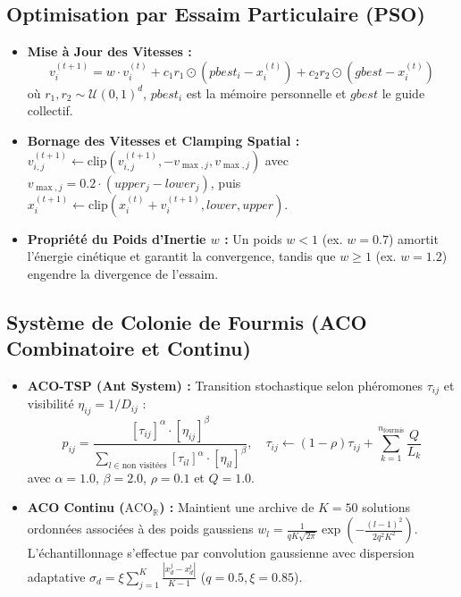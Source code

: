 \documentclass[11pt,a4paper]{article}
\begin{document}
\subsection{Optimisation par Essaim Particulaire (PSO)}
\begin{itemize}\setlength{\itemsep}{0.1em}
    \item \textbf{Mise à Jour des Vitesses :}
    \begin{equation}
        v_i^{(t+1)} = w \cdot v_i^{(t)} + c_1 r_1 \odot \left( pbest_i - x_i^{(t)} \right) + c_2 r_2 \odot \left( gbest - x_i^{(t)} \right)
    \end{equation}
    où $r_1, r_2 \sim \mathcal{U}(0, 1)^d$, $pbest_i$ est la mémoire personnelle et $gbest$ le guide collectif.
    \item \textbf{Bornage des Vitesses et Clamping Spatial :}
    $v_{i, j}^{(t+1)} \leftarrow \text{clip}(v_{i, j}^{(t+1)}, -v_{\max, j}, v_{\max, j})$ avec $v_{\max, j} = 0.2 \cdot (upper_j - lower_j)$, puis $x_i^{(t+1)} \leftarrow \text{clip}(x_i^{(t)} + v_i^{(t+1)}, lower, upper)$.
    \item \textbf{Propriété du Poids d'Inertie $w$ :} Un poids $w < 1$ (ex. $w=0.7$) amortit l'énergie cinétique et garantit la convergence, tandis que $w \ge 1$ (ex. $w=1.2$) engendre la divergence de l'essaim.
\end{itemize}

\subsection{Système de Colonie de Fourmis (ACO Combinatoire et Continu)}
\begin{itemize}\setlength{\itemsep}{0.1em}
    \item \textbf{ACO-TSP (Ant System) :} Transition stochastique selon phéromones $\tau_{ij}$ et visibilité $\eta_{ij} = 1/D_{ij}$ :
    \begin{equation}
        p_{ij} = \frac{[\tau_{ij}]^\alpha \cdot [\eta_{ij}]^\beta}{\sum_{l \in \text{non visitées}} [\tau_{il}]^\alpha \cdot [\eta_{il}]^\beta}, \quad \tau_{ij} \leftarrow (1 - \rho)\tau_{ij} + \sum_{k=1}^{n_{\text{fourmis}}} \frac{Q}{L_k}
    \end{equation}
    avec $\alpha=1.0$, $\beta=2.0$, $\rho=0.1$ et $Q=1.0$.
    \item \textbf{ACO Continu ($\text{ACO}_{\mathbb{R}}$) :} Maintient une archive de $K=50$ solutions ordonnées associées à des poids gaussiens $w_l = \frac{1}{q K \sqrt{2\pi}} \exp\left( -\frac{(l-1)^2}{2 q^2 K^2} \right)$. L'échantillonnage s'effectue par convolution gaussienne avec dispersion adaptative $\sigma_d = \xi \sum_{j=1}^K \frac{|x_d^j - x_d^l|}{K - 1}$ ($q=0.5, \xi=0.85$).
\end{itemize}
\end{document}
